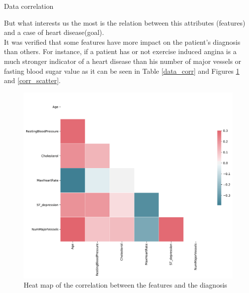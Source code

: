 \documentclass[conference]{IEEEtran}
\begin{document}
\begin{table}[htbp]
    \caption{Data correlation}
    \begin{center}
        
        \label{data_corr}
    \end{center}
\end{table}

\newpage

But what interests us the most is the relation between this attributes (features) and a case of heart disease(goal).
\\It was verified that some features have more impact on the patient's diagnosis than others. For instance, if a patient has or not exercise induced angina is a much stronger indicator of a heart disease than his number of major vessels or fasting blood sugar value as it can be seen in Table \ref{data_corr} and Figures \ref{corr_heatmap} and \ref{corr_scatter}.

\begin{figure}[htpb]
    \centerline{\includegraphics[width=0.7\linewidth]{images/correlation_heatmap.pdf}}
    \caption{Heat map of the correlation between the features and the diagnosis}
    \label{corr_heatmap}
\end{figure}
\end{document}
